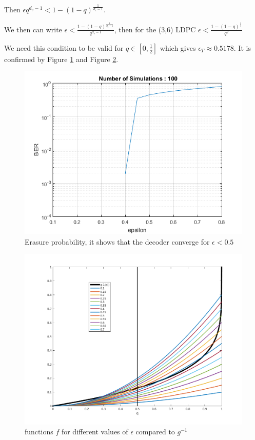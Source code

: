 \documentclass[a4paper]{article}
\begin{document}
Then $ \epsilon q^{d_v-1}<1-(1-q)^{\frac{1}{d_c-1}}$. 

We then can write $ \epsilon<\frac{1-(1-q)^{\frac{1}{d_c-1}}}{q^{d_v-1}}$, then for the (3,6) LDPC  $ \epsilon<\frac{1-(1-q)^{\frac{1}{5}}}{q^{2}}$

We need this condition to be valid for $q \in [0,\frac{1}{2}]$ which gives $ \epsilon_T \approx 0.5178 $. It is confirmed by Figure \ref{bec} and Figure \ref{fandg}.

\begin{figure}[ht!]
\centering
\begin{center}
\includegraphics[scale=0.70]{bec.png}
\caption{Erasure probability, it shows that the decoder converge for $\epsilon < 0.5$}
\label{bec}
\end{center}
\end{figure}

\begin{figure}[ht!]
\centering
\begin{center}
\includegraphics[scale=0.60]{fandg2.png}
\caption{functions $f$ for different values of $\epsilon$ compared to $g^{-1}$}
\label{fandg}
\end{center}
\end{figure}
\end{document}
